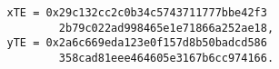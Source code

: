 \begin{verbatim}
                xTE = 0x29c132cc2c0b34c5743711777bbe42f3
                        2b79c022ad998465e1e71866a252ae18,
                yTE = 0x2a6c669eda123e0f157d8b50badcd586
                        358cad81eee464605e3167b6cc974166.
\end{verbatim}
